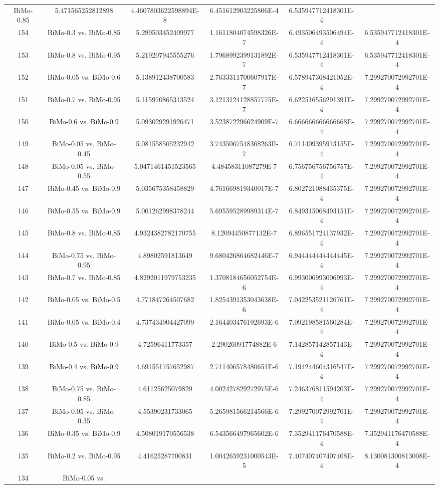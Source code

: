 \documentclass[a4paper,10pt]{article}
\begin{document}
\begin{landscape}
\begin{table}[!htp]
\begin{tabular}{cccccc}
BiMo-0.85&5.471565252812898&4.4607803622598894E-8&6.451612903225806E-4&6.535947712418301E-4\\154&BiMo-0.3 vs. BiMo-0.85&5.299503452409977&1.1611804074598326E-7&6.493506493506494E-4&6.535947712418301E-4\\153&BiMo-0.8 vs. BiMo-0.95&5.219207945555276&1.7968992399131892E-7&6.535947712418301E-4&6.535947712418301E-4\\152&BiMo-0.05 vs. BiMo-0.6&5.138912438700583&2.7633311700607917E-7&6.578947368421052E-4&7.299270072992701E-4\\151&BiMo-0.7 vs. BiMo-0.95&5.115970865313524&3.1213124128857775E-7&6.622516556291391E-4&7.299270072992701E-4\\150&BiMo-0.6 vs. BiMo-0.9&5.093029291926471&3.523872296624909E-7&6.666666666666668E-4&7.299270072992701E-4\\149&BiMo-0.05 vs. BiMo-0.45&5.081558505232942&3.7435067548368263E-7&6.711409395973155E-4&7.299270072992701E-4\\148&BiMo-0.05 vs. BiMo-0.55&5.0471461451523565&4.48458311087279E-7&6.756756756756757E-4&7.299270072992701E-4\\147&BiMo-0.45 vs. BiMo-0.9&5.035675358458829&4.761669819340017E-7&6.802721088435375E-4&7.299270072992701E-4\\146&BiMo-0.55 vs. BiMo-0.9&5.001262998378244&5.695595289989314E-7&6.849315068493151E-4&7.299270072992701E-4\\145&BiMo-0.8 vs. BiMo-0.85&4.9324382782170755&8.12094450877132E-7&6.896551724137932E-4&7.299270072992701E-4\\144&BiMo-0.75 vs. BiMo-0.95&4.89802591813649&9.680426864682446E-7&6.944444444444445E-4&7.299270072992701E-4\\143&BiMo-0.7 vs. BiMo-0.85&4.8292011979753235&1.3708184656052754E-6&6.993006993006993E-4&7.299270072992701E-4\\142&BiMo-0.05 vs. BiMo-0.5&4.771847264507682&1.8254391353043638E-6&7.042253521126761E-4&7.299270072992701E-4\\141&BiMo-0.05 vs. BiMo-0.4&4.737434904427099&2.164403476192693E-6&7.092198581560284E-4&7.299270072992701E-4\\140&BiMo-0.5 vs. BiMo-0.9&4.72596411773357&2.29026091774882E-6&7.142857142857143E-4&7.299270072992701E-4\\139&BiMo-0.4 vs. BiMo-0.9&4.691551757652987&2.711406578480651E-6&7.194244604316547E-4&7.299270072992701E-4\\138&BiMo-0.75 vs. BiMo-0.85&4.61125625079829&4.002427829272975E-6&7.246376811594203E-4&7.299270072992701E-4\\137&BiMo-0.05 vs. BiMo-0.35&4.55390231733065&5.265981566214566E-6&7.299270072992701E-4&7.299270072992701E-4\\136&BiMo-0.35 vs. BiMo-0.9&4.508019170556538&6.543566497965602E-6&7.352941176470588E-4&7.352941176470588E-4\\135&BiMo-0.2 vs. BiMo-0.95&4.41625287700831&1.0042659231000543E-5&7.407407407407408E-4&8.130081300813008E-4\\134&BiMo-0.05 vs. 
\end{tabular}
\end{table}
\end{landscape}
\end{document}
